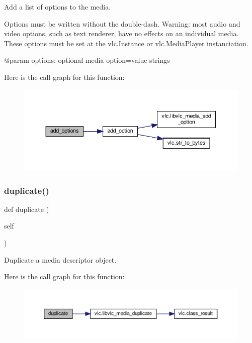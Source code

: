 \begin{DoxyVerb}Add a list of options to the media.

Options must be written without the double-dash. Warning: most
audio and video options, such as text renderer, have no
effects on an individual media. These options must be set at
the vlc.Instance or vlc.MediaPlayer instanciation.

@param options: optional media option=value strings
\end{DoxyVerb}
 Here is the call graph for this function\+:
\nopagebreak
\begin{figure}[H]
\begin{center}
\leavevmode
\includegraphics[width=350pt]{classvlc_1_1_media_afc1d9bd3735629f1ffba0c9c18c9306c_cgraph}
\end{center}
\end{figure}
\mbox{\label{classvlc_1_1_media_a738b65df9cba04f72e14313803fc60bb}} 
\subsubsection{\texorpdfstring{duplicate()}{duplicate()}}
{\footnotesize\ttfamily def duplicate (\begin{DoxyParamCaption}\item[{}]{self }\end{DoxyParamCaption})}

\begin{DoxyVerb}Duplicate a media descriptor object.
\end{DoxyVerb}
 Here is the call graph for this function\+:
\nopagebreak
\begin{figure}[H]
\begin{center}
\leavevmode
\includegraphics[width=350pt]{classvlc_1_1_media_a738b65df9cba04f72e14313803fc60bb_cgraph}
\end{center}
\end{figure}
\mbox{\label{classvlc_1_1_media_ab7c92812cd259eb8e4e4fd292b81bfaa}} 

